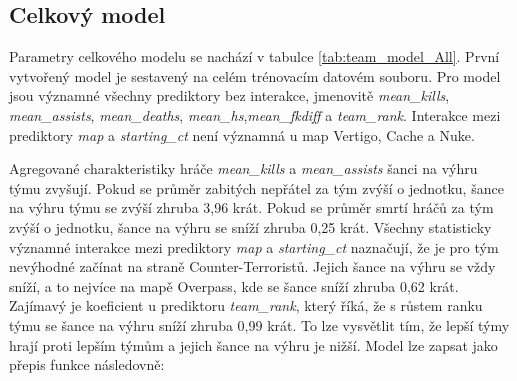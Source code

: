 \subsection{Celkový model}



Parametry celkového modelu se nachází v tabulce \ref{tab:team_model_All}. První vytvořený model je sestavený na celém trénovacím datovém souboru. Pro model jsou
významné všechny prediktory bez interakce, jmenovitě \textit{mean\_kills}, \textit{mean\_assists}, \textit{mean\_deaths}, \textit{mean\_hs},\textit{mean\_fkdiff} a
\textit{team\_rank}. Interakce mezi prediktory \textit{map} a \textit{starting\_ct} není významná u map Vertigo, Cache a Nuke.

Agregované charakteristiky hráče \textit{mean\_kills} a \textit{mean\_assists} šanci na výhru týmu zvyšují. Pokud se průměr zabitých nepřátel za tým zvýší o jednotku,
šance na výhru týmu se zvýší zhruba 3,96 krát. Pokud se průměr smrtí hráčů za tým zvýší o jednotku, šance na výhru se sníží zhruba 0,25 krát. Všechny statisticky
významné interakce mezi prediktory \textit{map} a \textit{starting\_ct} naznačují, že je pro tým nevýhodné začínat na straně Counter-Terroristů. Jejich šance
na výhru se vždy sníží, a to nejvíce na mapě Overpass, kde se šance sníží zhruba 0,62 krát. Zajímavý je koeficient u prediktoru \textit{team\_rank}, který říká,
že s růstem ranku týmu se šance na výhru sníží zhruba 0,99 krát. To lze vysvětlit tím, že lepší týmy hrají proti lepším týmům a jejich 
šance na výhru je nižší. Model lze zapsat jako přepis funkce následovně:

